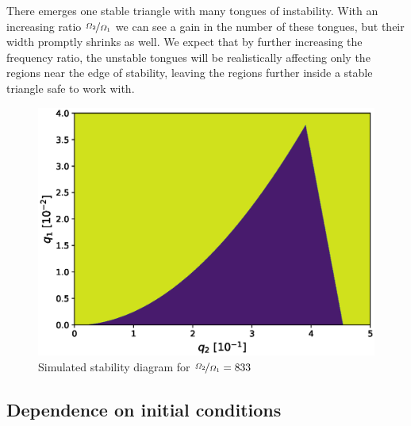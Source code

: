 There emerges one stable triangle with many tongues of instability. With an increasing ratio $\nicefrac{\Omega_2}{\Omega_1}$ we can see a gain in the number of these tongues, but their width promptly shrinks as well. We expect that by further increasing the frequency ratio, the unstable tongues will be realistically affecting only the regions near the edge of stability, leaving the regions further inside a stable triangle safe to work with.


\begin{figure}[H]
	\centering
	\includegraphics[width=\linewidth]{img/0_ions_1_electrons_q1_0.0-0.04_q2_0.0-0.5_897x897_833.eps}
	\caption{Simulated stability diagram for $\nicefrac{\Omega_2}{\Omega_1} = 833$}
	\label{fig:stabil-eta=833}
\end{figure}

\subsection{Dependence on initial conditions}

